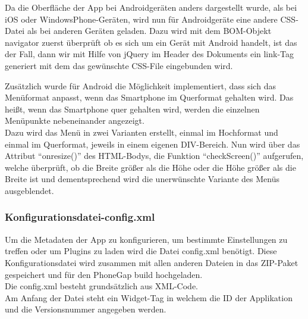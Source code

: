 Da die Oberfläche der App bei Androidgeräten anders dargestellt wurde, als bei iOS oder WindowsPhone-Geräten, wird nun für Androidgeräte eine andere CSS-Datei als bei anderen Geräten geladen. Dazu wird mit dem BOM-Objekt navigator zuerst überprüft ob es sich um ein Gerät mit Android handelt, ist das der Fall, dann wir mit Hilfe von jQuery im Header des Dokuments ein link-Tag generiert mit dem das gewünschte CSS-File eingebunden wird.




Zusätzlich wurde für Android die Möglichkeit implementiert, dass sich das Menüformat anpasst, wenn das Smartphone im Querformat gehalten wird. Das heißt, wenn das Smartphone quer gehalten wird, werden die einzelnen Menüpunkte nebeneinander angezeigt.\\
Dazu wird das Menü in zwei Varianten erstellt, einmal im Hochformat und einmal im Querformat, jeweils in einem eigenen DIV-Bereich. Nun wird über das Attribut \enquote{onresize()} des HTML-Bodys, die Funktion \enquote{checkScreen()} aufgerufen, welche überprüft, ob die Breite größer als die Höhe oder die Höhe größer als die Breite ist  und dementsprechend wird die unerwünschte Variante des Menüs ausgeblendet.\\




\subsubsection{Konfigurationsdatei-config.xml}

Um die Metadaten der App zu konfigurieren, um bestimmte Einstellungen zu treffen oder um Plugins zu laden wird die Datei config.xml benötigt. Diese Konfigurationsdatei wird zusammen mit allen anderen Dateien in das ZIP-Paket gespeichert und für den PhoneGap build hochgeladen.\\
Die config.xml besteht grundsätzlich aus XML-Code.\\
Am Anfang der Datei steht ein Widget-Tag in welchem die ID der Applikation und die Versionsnummer angegeben werden.\\
 
